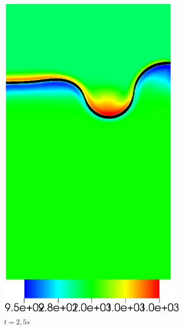 \begin{figure}[H]
\begin{subfigure}[ht!]{0.2\textwidth}
		\includegraphics[width=1\textwidth]{figure/PT_RT/masse_vol/visit0020.png}
		\caption{$t=2,5s$}
	\end{subfigure}
	\begin{subfigure}[ht!]{0.2\textwidth}
		\centering

\end{subfigure}
\end{figure}

